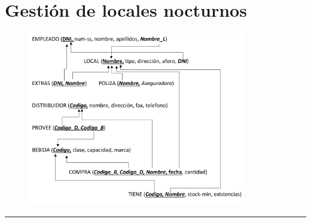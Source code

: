 \documentclass[a4paper]{article}
\begin{document}
\section{Gestión de locales nocturnos}


\begin{figure}[H]
    \includegraphics[width=0.85\textwidth]{figs/gestion-locales-nocturnos-sol.pdf}
\end{figure}

\vspace{2em}
\hrule
\doclicenseThis
\end{document}

